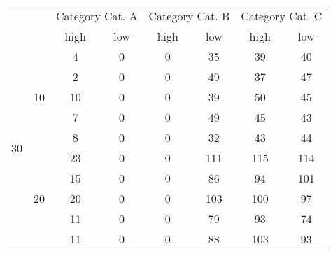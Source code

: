 \begin{table}[h]
\begin{tabular}{cc|c|c|c|c|c|c|}
\cline{3-8}
                                           &                     & \multicolumn{2}{c|}{Category Cat. A} & \multicolumn{2}{c|}{Category Cat. B} & \multicolumn{2}{c|}{Category Cat. C} \\ \cline{3-8} 
                                           &                     & high   & low  & high   & low  & high   & low  \\ \hline
\multicolumn{1}{|c|}{\multirow{15}{*}{30}} & \multirow{5}{*}{10} & 4               & 0             & 0               & 35            & 39              & 40            \\ \cline{3-8} 
\multicolumn{1}{|c|}{}                     &                     & 2               & 0             & 0               & 49            & 37              & 47            \\ \cline{3-8} 
\multicolumn{1}{|c|}{}                     &                     & 10              & 0             & 0               & 39            & 50              & 45            \\ \cline{3-8} 
\multicolumn{1}{|c|}{}                     &                     & 7               & 0             & 0               & 49            & 45              & 43            \\ \cline{3-8} 
\multicolumn{1}{|c|}{}                     &                     & 8               & 0             & 0               & 32            & 43              & 44            \\ \cline{2-8} 
\multicolumn{1}{|c|}{}                     & \multirow{5}{*}{20} & 23              & 0             & 0               & 111           & 115             & 114           \\ \cline{3-8} 
\multicolumn{1}{|c|}{}                     &                     & 15              & 0             & 0               & 86            & 94              & 101           \\ \cline{3-8} 
\multicolumn{1}{|c|}{}                     &                     & 20              & 0             & 0               & 103           & 100             & 97            \\ \cline{3-8} 
\multicolumn{1}{|c|}{}                     &                     & 11              & 0             & 0               & 79            & 93              & 74            \\ \cline{3-8} 
\multicolumn{1}{|c|}{}                     &                     & 11              & 0             & 0               & 88            & 103             & 93            \\ \cline{2-8} 

\end{tabular}
\end{table}

